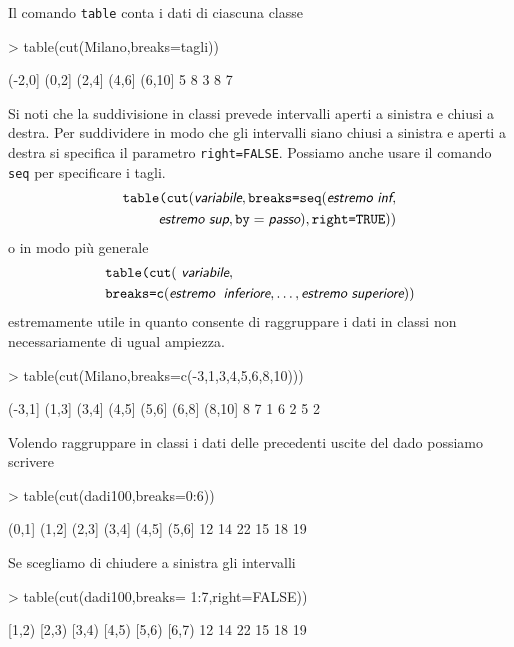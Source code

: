 \documentclass[onecolumn,12pt]{book}
\newcommand{\varia}[1]{\textsl{\textsf{#1}}}
\begin{document}
Il comando \texttt{table} conta i dati di ciascuna classe

\begin{Schunk}
\begin{Sinput}
> table(cut(Milano,breaks=tagli))
\end{Sinput}
\begin{Soutput}
(-2,0]  (0,2]  (2,4]  (4,6] (6,10] 
     5      8      3      8      7 
\end{Soutput}
\end{Schunk}
Si noti che la suddivisione in classi prevede intervalli aperti a sinistra e chiusi a destra.
Per suddividere in modo che gli intervalli siano chiusi a sinistra e aperti a destra si specifica il parametro \texttt{right=FALSE}.
Possiamo anche usare il comando \texttt{seq} per specificare i tagli.
 \begin{eqnarray*}
\texttt{table(cut}( \varia{variabile},\texttt{breaks=seq}(\varia{estremo inf},\\
\varia{estremo sup},\texttt{by}=\varia{passo}),\texttt{right=TRUE}))
\end{eqnarray*}
o in modo  pi\`u generale
\begin{eqnarray*}
&\texttt{table(cut}(\varia{ variabile},\\
&\texttt{breaks=c}(\varia{estremo\; inferiore}, \ldots,\varia{estremo superiore}))
\end{eqnarray*}
estremamente utile in quanto consente di raggruppare i dati in classi non necessariamente di ugual ampiezza.
\begin{Schunk}
\begin{Sinput}
> table(cut(Milano,breaks=c(-3,1,3,4,5,6,8,10)))
\end{Sinput}
\begin{Soutput}
(-3,1]  (1,3]  (3,4]  (4,5]  (5,6]  (6,8] (8,10] 
     8      7      1      6      2      5      2 
\end{Soutput}
\end{Schunk}
Volendo raggruppare in classi i dati delle precedenti uscite del dado possiamo scrivere
\begin{Schunk}
\begin{Sinput}
> table(cut(dadi100,breaks=0:6))
\end{Sinput}
\begin{Soutput}
(0,1] (1,2] (2,3] (3,4] (4,5] (5,6] 
   12    14    22    15    18    19 
\end{Soutput}
\end{Schunk}
Se scegliamo di chiudere a sinistra gli intervalli
\begin{Schunk}
\begin{Sinput}
> table(cut(dadi100,breaks= 1:7,right=FALSE))
\end{Sinput}
\begin{Soutput}
[1,2) [2,3) [3,4) [4,5) [5,6) [6,7) 
   12    14    22    15    18    19 
\end{Soutput}
\end{Schunk}
\end{document}
